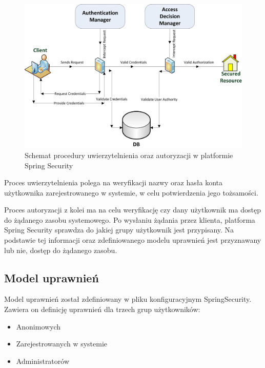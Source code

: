 \begin{figure}[h]
	\centering
	\includegraphics[scale=0.7]{images/spring_diagram.jpg}
	\caption{Schemat procedury uwierzytelnienia oraz autoryzacji w platformie Spring Security}
\end{figure}

Proces uwierzytelnienia polega na weryfikacji nazwy oraz hasła konta użytkownika zarejestrowanego w systemie, w celu potwierdzenia jego tożsamości. 

Proces autoryzacji z kolei ma na celu weryfikację czy dany użytkownik ma dostęp do żądanego zasobu systemowego. Po wysłaniu żądania przez klienta, platforma Spring Security sprawdza do jakiej grupy użytkownik jest przypisany. Na podstawie tej informacji oraz zdefiniowanego modelu uprawnień jest przyznawany lub nie, dostęp do żądanego zasobu.

\subsection{Model uprawnień}

Model uprawnień został zdefiniowany w pliku konfiguracyjnym SpringSecurity. Zawiera on definicję uprawnień dla  trzech grup użytkowników:

\begin{itemize}
\item Anonimowych
\item Zarejestrowanych w systemie
\item Administratorów
\end{itemize}


